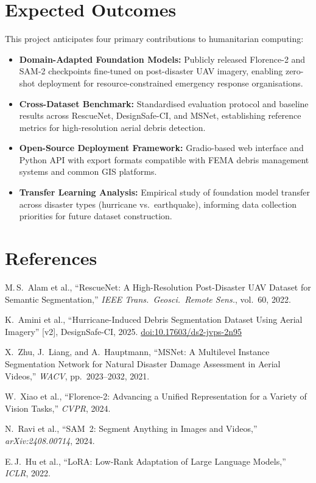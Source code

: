 \documentclass[10pt,a4paper,twocolumn]{article}
\begin{document}
\section{Expected Outcomes}

This project anticipates four primary contributions to humanitarian computing:

\begin{itemize}
  \item \textbf{Domain-Adapted Foundation Models:} Publicly released Florence-2
    and SAM-2 checkpoints fine-tuned on post-disaster UAV imagery, enabling
    zero-shot deployment for resource-constrained emergency response organisations.
  \item \textbf{Cross-Dataset Benchmark:} Standardised evaluation protocol and
    baseline results across RescueNet, DesignSafe-CI, and MSNet, establishing
    reference metrics for high-resolution aerial debris detection.
  \item \textbf{Open-Source Deployment Framework:} Gradio-based web interface and
    Python API with export formats compatible with FEMA debris management systems
    and common GIS platforms.
  \item \textbf{Transfer Learning Analysis:} Empirical study of foundation model
    transfer across disaster types (hurricane vs.\ earthquake), informing data
    collection priorities for future dataset construction.
\end{itemize}

\section{References}

\fontsize{7.5}{9.5}\selectfont
\setlength{\parskip}{2pt}

\noindent[1] M.\,S.\ Alam et al., ``RescueNet: A High-Resolution Post-Disaster UAV Dataset
for Semantic Segmentation,'' \textit{IEEE Trans.\ Geosci.\ Remote Sens.}, vol.~60, 2022.

\noindent[2] K.\ Amini et al., ``Hurricane-Induced Debris Segmentation Dataset Using Aerial
Imagery'' [v2], DesignSafe-CI, 2025. \href{https://doi.org/10.17603/ds2-jvps-2n95}{doi:10.17603/ds2-jvps-2n95}

\noindent[3] X.\ Zhu, J.\ Liang, and A.\ Hauptmann, ``MSNet: A Multilevel Instance
Segmentation Network for Natural Disaster Damage Assessment in Aerial Videos,''
\textit{WACV}, pp.~2023--2032, 2021.

\noindent[4] W.\ Xiao et al., ``Florence-2: Advancing a Unified Representation for a Variety
of Vision Tasks,'' \textit{CVPR}, 2024.

\noindent[5] N.\ Ravi et al., ``SAM~2: Segment Anything in Images and Videos,''
\textit{arXiv:2408.00714}, 2024.

\noindent[6] E.\,J.\ Hu et al., ``LoRA: Low-Rank Adaptation of Large Language Models,''
\textit{ICLR}, 2022.
\end{document}
